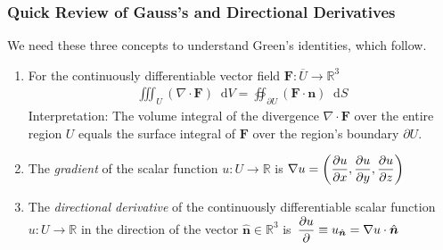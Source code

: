 \documentclass[11pt, a4paper]{article}
\newcommand{\diff}{\mathop{}\!\mathrm{d}} %
\renewcommand{\vec}[1]{\bm{#1}}
\newcommand{\uvec}[1]{\hat{\vec{#1}}}
\renewcommand{\div}{\nabla \cdot}
\renewcommand{\grad}{\nabla}
\newcommand{\R}{\mathbb{R}} %
\begin{document}
\subsubsection{Quick Review of Gauss's and Directional Derivatives}
We need these three concepts to understand Green's identities, which follow.
\begin{enumerate}
	\item For the continuously differentiable vector field $ \bm{F} : \overline{U} \to \R^3  $
	\begin{align*}
		 \iiint_{U} (\div{\bm{F}}) \diff V = \oiint_{\partial U} (\bm{F} \cdot \bm{n}) \diff S
	\end{align*}
	Interpretation: The volume integral of the divergence $ \div{\bm{F}} $ over the entire region $ U $ equals the surface integral of $ \bm{F} $ over the region's boundary $ \partial U $.
	
	\item The \textit{gradient} of the scalar function $ u: U \to \R $ is $ \displaystyle{\grad{u} = \left(\pdv{u}{x}, \pdv{u}{y}, \pdv{u}{z} \right)} $
	
	\item The \textit{directional derivative} of the continuously differentiable scalar function $ u: U \to \R $ in the direction of the vector $ \uvec{n} \in \R^{3} $ is $\, \displaystyle{\pdv{u}{} \equiv u_{\uvec{n}} = \grad{u} \cdot \uvec{n}} $
\end{enumerate}
\end{document}
